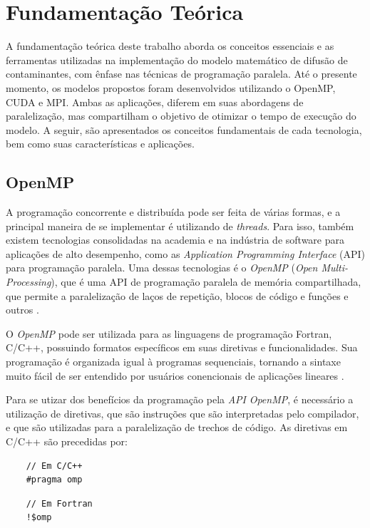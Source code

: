 \documentclass[12pt]{article}
\begin{document}
\section{Fundamentação Teórica} \label{sec:fundaTeorica}
A fundamentação teórica deste trabalho aborda os conceitos essenciais e as ferramentas utilizadas na implementação do modelo matemático de difusão de contaminantes, com ênfase nas técnicas de programação paralela. Até o presente momento, os modelos propostos foram desenvolvidos utilizando o OpenMP, CUDA e MPI. Ambas as aplicações, diferem em suas abordagens de paralelização, mas compartilham o objetivo de otimizar o tempo de execução do modelo. A seguir, são apresentados os conceitos fundamentais de cada tecnologia, bem como suas características e aplicações.

\subsection{OpenMP} \label{subsec:openmp}
A programação concorrente e distribuída pode ser feita de várias formas, e a principal maneira de se implementar é utilizando de \emph{threads}. Para isso, também existem tecnologias consolidadas na academia e na indústria de software para aplicações de alto desempenho, como as \emph{Application Programming Interface} (API) para programação paralela. Uma dessas tecnologias é o \emph{OpenMP} (\emph{Open Multi-Processing}), que é uma API de programação paralela de memória compartilhada, que permite a paralelização de laços de repetição, blocos de código e funções e outros \cite{chapman:2007}.

O \emph{OpenMP} pode ser utilizada para as linguagens de programação Fortran, C/C++, possuindo formatos específicos em suas diretivas e funcionalidades. Sua programação é organizada igual à programas sequenciais, tornando a sintaxe muito fácil de ser entendido por usuários conencionais de aplicações lineares \cite{gropp:2017}.

Para se utizar dos benefícios da programação pela \emph{API} \emph{OpenMP}, é necessário a utilização de diretivas, que são instruções que são interpretadas pelo compilador, e que são utilizadas para a paralelização de trechos de código. As diretivas em C/C++ são precedidas por:

\begin{minipage}[t]{0.48\textwidth}
  \begin{verbatim}
    // Em C/C++
    #pragma omp
  \end{verbatim}
  \end{minipage}
\hfill
\begin{minipage}[t]{0.48\textwidth}
  \begin{verbatim}
    // Em Fortran
    !$omp
  \end{verbatim}
  \end{minipage}
\end{document}
